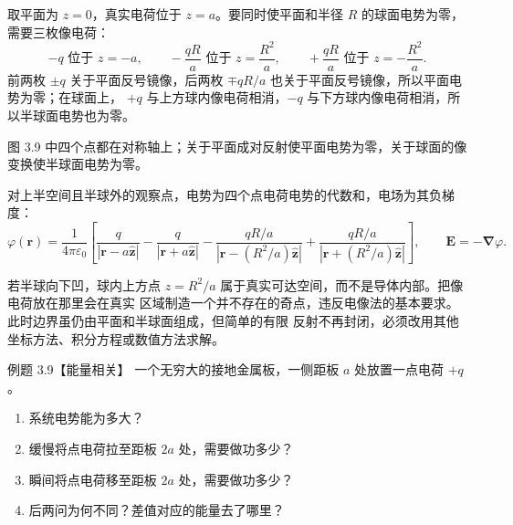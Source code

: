 \begin{xesolution}
取平面为 $z=0$，真实电荷位于 $z=a$。要同时使平面和半径 $R$ 的球面电势为零，需要三枚像电荷：
\[
  -q\text{ 位于 }z=-a,\qquad
  -\frac{qR}{a}\text{ 位于 }z=\frac{R^2}{a},\qquad
  +\frac{qR}{a}\text{ 位于 }z=-\frac{R^2}{a}.
\]
前两枚 $\pm q$ 关于平面反号镜像，后两枚 $\mp qR/a$ 也关于平面反号镜像，所以平面电势为零；在球面上，
$+q$ 与上方球内像电荷相消，$-q$ 与下方球内像电荷相消，所以半球面电势也为零。

图 3.9 中四个点都在对称轴上；关于平面成对反射使平面电势为零，关于球面的像变换使半球面电势为零。

\hemisphereImagesFigure
{}

对上半空间且半球外的观察点，电势为四个点电荷电势的代数和，电场为其负梯度：
\[
  \boxed{\varphi(\boldsymbol r)=\frac1{4\pi\varepsilon_0}
  \left[
  \frac q{|\boldsymbol r-a\hat{\boldsymbol z}|}
  -\frac q{|\boldsymbol r+a\hat{\boldsymbol z}|}
  -\frac{qR/a}{|\boldsymbol r-(R^2/a)\hat{\boldsymbol z}|}
  +\frac{qR/a}{|\boldsymbol r+(R^2/a)\hat{\boldsymbol z}|}
  \right]},
  \qquad \boldsymbol E=-\boldsymbol\nabla\varphi.
\]

若半球向下凹，球内上方点 $z=R^2/a$ 属于真实可达空间，而不是导体内部。把像电荷放在那里会在真实
区域制造一个并不存在的奇点，违反电像法的基本要求。此时边界虽仍由平面和半球面组成，但简单的有限
反射不再封闭，必须改用其他坐标方法、积分方程或数值方法求解。
\end{xesolution}

\begin{origexamplebox}{例题 3.9【能量相关】}
一个无穷大的接地金属板，一侧距板 $a$ 处放置一点电荷 $+q$。
\begin{enumerate}[label=(\arabic*)]
  \item 系统电势能为多大？
  \item 缓慢将点电荷拉至距板 $2a$ 处，需要做功多少？
  \item 瞬间将点电荷移至距板 $2a$ 处，需要做功多少？
  \item 后两问为何不同？差值对应的能量去了哪里？
\end{enumerate}
\end{origexamplebox}


